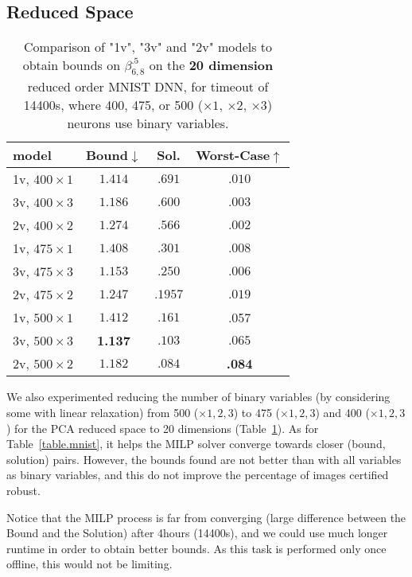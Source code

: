 \newpage


\subsection{Reduced Space}

\begin{table}[h!]
	\centering
	\begin{tabular}{||l||c|c|c||}\hline\hline
		model &        Bound$\downarrow$ &  Sol. &      Worst-Case$\uparrow$ \\\hline \hline
1v, $400 \times 1$ & $1.414$ &  $.691$ & $.010$ \\\hline 
3v, $400 \times 3$ & $1.186$ & $.600$ & $.003$ \\\hline 
2v, $400 \times 2$ & $1.274$ & $.566$ & $.002$ \\\hline\hline
	 
1v, $475 \times 1$ &  $1.408$ & $.301$ & $.008$  \\\hline 
3v, $475 \times 3$ &  $1.153$ & $.250$ & $.006$ \\ \hline 
2v, $475 \times 2$ &  $1.247$ & $.1957$ & $.019$ \\\hline\hline

1v, $500 \times 1$ & $1.412$ & $.161$ & .057 \\\hline 
3v, $500 \times 3$ & {\bf 1.137} & $.103$ & $.065$\\\hline 
2v, $500 \times 2$ &  $1.182$ & $.084$& {\bf .084}  \\\hline\hline
	 
	\end{tabular}
	\caption{Comparison of "1v", "3v" and "2v" models 
	to obtain bounds on $\beta^{.5}_{6,8}$ on the {\bf 20 dimension} reduced order MNIST DNN, for timeout of 14400s, 
	where 400, 475,  or 500 ($\times 1$, $\times 2$, $\times 3$) neurons use binary variables.}
	\label{table.reduced}
\end{table}


We also experimented reducing the number of binary variables (by considering some with linear relaxation) from 500 ($\times 1,2,3$) to 475 ($\times 1,2,3$) and 400 ($\times 1,2,3$) for the PCA reduced space to 20 dimensions (Table~\ref{table.reduced}). 
As for Table~\ref{table.mnist}, it helps the MILP solver converge towards closer (bound, solution) pairs. However, the bounds found are not better than with all variables as binary variables, and this do not improve the percentage of images certified robust.


Notice that the MILP process is far from converging (large difference between the Bound and the Solution) after 4hours (14400s), and we could use much longer 
runtime in order to obtain better bounds. As this task is performed only once offline, this would not be limiting.


